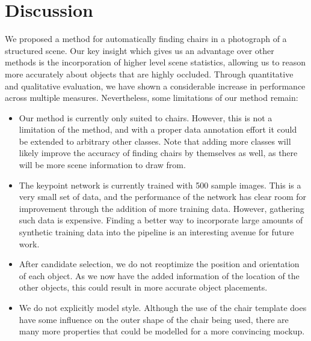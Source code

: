 \documentclass[10pt,twocolumn,letterpaper]{article}
\begin{document}
\section{Discussion}
We proposed a method for automatically finding chairs in a photograph of a structured scene.
Our key insight which gives us an advantage over other methods is the incorporation of higher level
scene statistics, allowing us to reason more accurately about objects that are highly occluded.
Through quantitative and qualitative evaluation, we have shown a considerable increase in performance
across multiple measures. Nevertheless, some limitations of our method remain:
\begin{itemize}
    \item Our method is currently only suited to chairs. However, this is not a limitation of the method, and with a proper data annotation effort 
        it could be extended to arbitrary other classes. Note that adding more classes will likely improve the accuracy of finding chairs by themselves as well,
        as there will be more scene information to draw from.
    \item The keypoint network is currently trained with 500 sample images. This is a very small set of data, and the performance of the network has clear room for improvement
        through the addition of more training data. However, gathering such data is expensive. Finding a better way to incorporate large amounts of synthetic training
        data into the pipeline is an interesting avenue for future work.
    \item After candidate selection, we do not reoptimize the position and orientation of each object. As we now have the added information of the location of the other objects, 
        this could result in more accurate object placements.
    \item We do not explicitly model style. Although the use of the chair template does have some influence on the outer shape of the chair being used, there are many more
        properties that could be modelled for a more convincing mockup.
\end{itemize}


{\small


}
\end{document}
